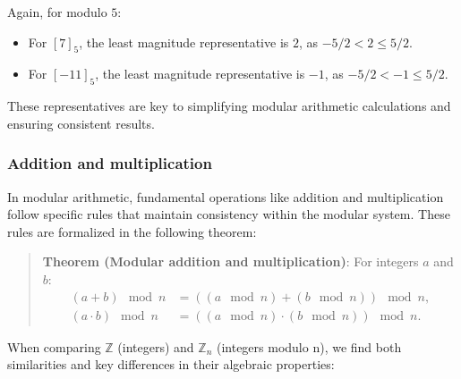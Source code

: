 \documentclass[
  letterpaper,
  DIV=11,
  numbers=noendperiod,
  oneside]{scrartcl}
\providecommand{\tightlist}{%
  \setlength{\itemsep}{0pt}\setlength{\parskip}{0pt}}\usepackage{longtable,booktabs,array}
\begin{document}
Again, for modulo \(5\):

\begin{itemize}
\tightlist
\item
  For \([7]_5\), the least magnitude representative is \(2\), as
  \(-5/2 < 2 \leq 5/2\).
\item
  For \([-11]_5\), the least magnitude representative is \(-1\), as
  \(-5/2 < -1 \leq 5/2\).
\end{itemize}

These representatives are key to simplifying modular arithmetic
calculations and ensuring consistent results.

\subsubsection{Addition and
multiplication}\label{addition-and-multiplication}

In modular arithmetic, fundamental operations like addition and
multiplication follow specific rules that maintain consistency within
the modular system. These rules are formalized in the following theorem:

\begin{quote}
\textbf{Theorem (Modular addition and multiplication)}: For integers
\(a\) and \(b\): \[
\begin{aligned}
(a + b) \mod n &= ((a \mod n) + (b \mod n)) \mod n, \\
(a \cdot b) \mod n &= ((a \mod n) \cdot (b \mod n)) \mod n.
\end{aligned}
\]
\end{quote}

When comparing \(\mathbb{Z}\) (integers) and \(\mathbb{Z}_n\) (integers
modulo n), we find both similarities and key differences in their
algebraic properties:
\end{document}

